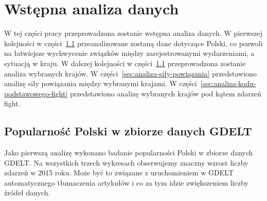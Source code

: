 \documentclass[11pt]{report}
\begin{document}
    \chapter{Wstępna analiza danych}\label{ch:wstępna-analiza-danych}
    W tej części pracy przeprowadzona zostanie wstępna analiza danych.
    W pierwszej kolejności w części~\ref{sec:popularność-polski-w-zbiorze-danych-gdelt} przeanalizowane zostaną dane dotyczące Polski, co pozwoli na łatwiejsze wychwycenie związków między zarejestrowanymi wydarzeniami, a sytuacją w kraju.
    W dalszej kolejności w części~\ref{sec:popularność-polski-w-zbiorze-danych-gdelt} przeprowadzona zostanie analiza wybranych krajów.
    W części~\ref{sec:analiza-siły-powiązania} przedstawiono analizę siły powiązania między wybranymi krajami.
    W części~\ref{sec:analiza-kodu-podstawowego-fight} przedstawiono analizę wybranych krajów pod kątem zdarzeń fight.


    \section{Popularność Polski w zbiorze danych GDELT}\label{sec:popularność-polski-w-zbiorze-danych-gdelt}
    Jako pierwszą analizę wykonano badanie popularności Polski w zbiorze danych GDELT. Na wszystkich trzech wykresach obserwujemy znaczny wzrost liczby zdarzeń w 2015 roku. Może być to związane z uruchomieniem w GDELT automatycznego tłumaczenia artykułów i co za tym idzie zwiększeniem liczby źródeł danych.
\end{document}
